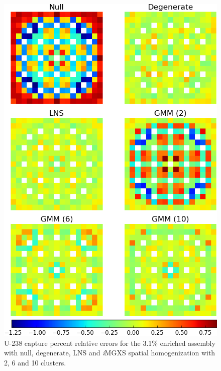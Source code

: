 \begin{figure}[h!]
\centering
\includegraphics[width=0.9\linewidth]{figures/results/spatial/assm-31/capt-err}
\vspace{2mm}
\caption[U-238 capture errors for the 3.1\% enriched assembly]{U-238 capture percent relative errors for the 3.1\% enriched assembly with null, degenerate, \ac{LNS} and \textit{i}\ac{MGXS} spatial homogenization with 2, 6 and 10 clusters.}
\label{fig:chap11-assm-3.1-capt-err}
\end{figure}

\clearpage

